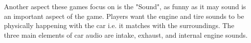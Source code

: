 \begin{enumerate}
	Another aspect these games focus on is the "Sound", as funny as it may sound is an important aspect of the game. Players want the engine and tire sounds to be physically happening with the car i.e. it matches with the surroundings. The three main elements of car audio are intake, exhaust, and internal engine sounds. 



\end{enumerate}


